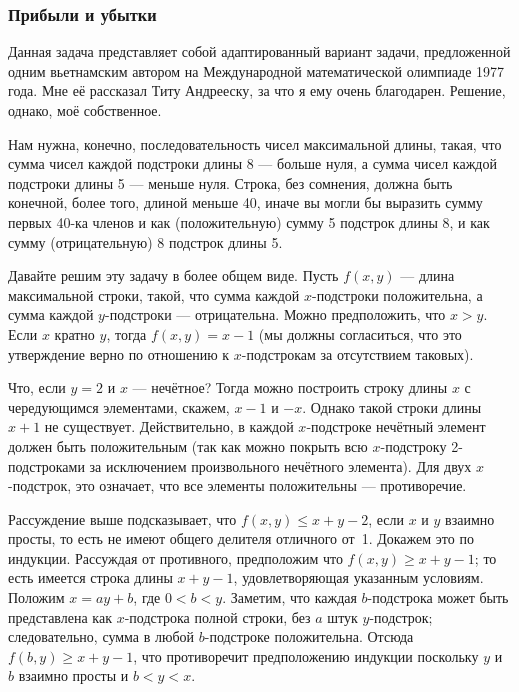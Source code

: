 \subsubsection*{Прибыли и убытки}%

Данная задача представляет собой адаптированный вариант задачи, предложенной одним вьетнамским автором на Международной математической олимпиаде 1977 года.
Мне её рассказал Титу Андрееску, %
за что я ему очень благодарен.
Решение, однако, моё собственное.

Нам нужна, конечно, последовательность чисел максимальной длины, такая, что сумма чисел каждой подстроки длины 8 --- больше нуля, а сумма чисел каждой подстроки длины 5 --- меньше нуля.
Строка, без сомнения, должна быть конечной, более того, длиной меньше 40, иначе вы могли бы выразить сумму первых 40-ка членов и как (положительную) сумму 5 подстрок длины 8, и как сумму (отрицательную) 8 подстрок длины 5.

Давайте решим эту задачу в более общем виде.
Пусть $f(x,y)$ --- длина максимальной строки, такой, что сумма каждой $x$-подстроки положительна, а сумма каждой $y$-подстроки --- отрицательна.
Можно предположить, что $x>y$.
Если $x$ кратно $y$, тогда $f(x,y)=x-1$ (мы должны согласиться, что это утверждение верно по отношению к $x$-подстрокам за отсутствием таковых).

Что, если $y=2$ и $x$ --- нечётное?
Тогда можно построить строку длины $x$ с чередующимся элементами, скажем, $x-1$ и $-x$.
Однако такой строки длины $x+1$ не существует.
Действительно, в каждой $x$-подстроке нечётный элемент должен быть положительным 
(так как можно покрыть всю $x$-подстроку 2-подстроками за исключением произвольного нечётного элемента).
Для двух $x$-подстрок, это означает, что все элементы положительны ---
противоречие.

Рассуждение выше подсказывает, что $f(x,y)\le x+y-2$, если $x$ и $y$ взаимно просты, 
то есть не имеют общего делителя отличного от~1.
Докажем это по индукции.
Рассуждая от противного, предположим что $f(x,y)\ge x+y-1$;
то есть имеется строка длины $x+y-1$, удовлетворяющая указанным условиям.
Положим $x=ay+b$, где $0<b<y$.
Заметим, что каждая $b$-подстрока %
может быть представлена как $x$-подстрока полной строки, 
без $a$ штук $y$-подстрок; 
следовательно, сумма в любой $b$-подстроке положительна.
Отсюда
$f(b,y)\ge x+y-1$,
что противоречит предположению индукции поскольку $y$ и $b$ взаимно просты и $b<y<x$.

